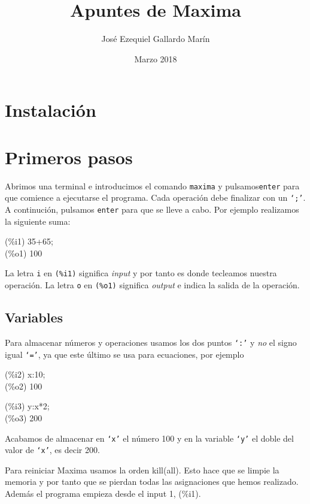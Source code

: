 \documentclass[a4paper, 12pt] {article}
\begin{document}
\title{Apuntes de Maxima}
\author{Jos\'e Ezequiel Gallardo Mar\'in}
\date{Marzo 2018}
\maketitle
\pagebreak
\section{Instalación}
\section{Primeros pasos}
Abrimos una terminal e introducimos el comando \texttt{maxima} y pulsamos\linebreak \texttt{enter} para que comience a ejecutarse el programa.\newline \newline
Cada operación debe finalizar con un \texttt{`;'}. A continución, pulsamos \texttt{enter} para que se lleve a cabo. \newline \newline
Por ejemplo realizamos la siguiente suma:
\begin{center}
  (\%i1) 35+65;\\(\%o1) 100
\end{center}
La letra \texttt{i} en \texttt{(\%i1)} significa \textit{input} y por tanto es donde tecleamos nuestra operación.
La letra \texttt{o} en \texttt{(\%o1)} significa \textit{output} e indica la salida de la \linebreak operación.
\subsection{Variables}
Para almacenar números y operaciones usamos los dos puntos \texttt{`:'} y \emph{no} el signo igual \texttt{`='}, ya que este último se usa para ecuaciones, por ejemplo
\begin{center}
  (\%i2) x:10;\\(\%o2) 100
\end{center}
\begin{center}
    (\%i3) y:x*2;\\(\%o3) 200
\end{center}
Acabamos de almacenar en \texttt{`x'} el número 100 y en la variable \texttt{`y'} el doble del valor de \texttt{`x'}, es decir 200. 

Para reiniciar Maxima usamos la orden kill(all). Esto hace que se limpie la memoria y por tanto que se pierdan todas las asignaciones que hemos realizado. Además el programa empieza desde el input 1, (\%i1).
\pagebreak
\end{document}
